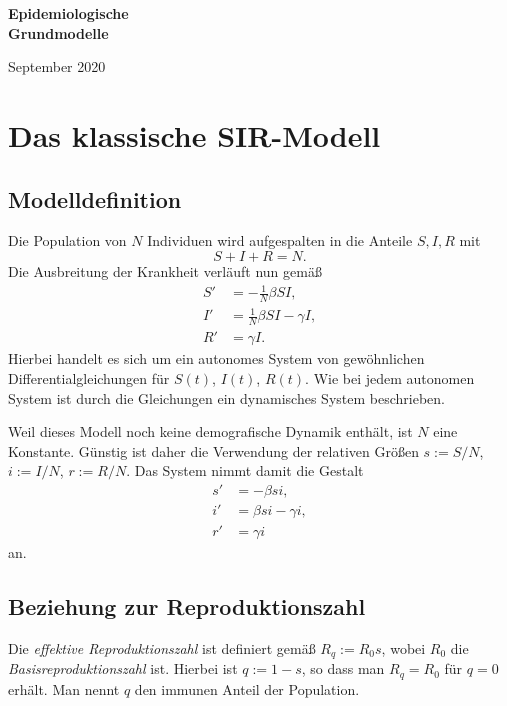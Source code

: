 \documentclass[a4paper,10pt,fleqn,twocolumn,twoside,dvipdfmx]{scrartcl}
\numberwithin{equation}{section}
\begin{document}

\noindent
{\huge\textbf{Epidemiologische\\
Grundmodelle}\par}

\vspace{1em}\noindent
{\large September 2020}

\tableofcontents

\section{Das klassische SIR-Modell}
\subsection{Modelldefinition}

Die Population von $N$ Individuen wird aufgespalten in die Anteile
$S,I,R$ mit%
\begin{equation}
S+I+R=N.
\end{equation}
Die Ausbreitung der Krankheit verläuft nun gemäß%
\begin{align}
S' &= -\tfrac{1}{N} \beta SI,\\
I' &= \tfrac{1}{N} \beta SI - \gamma I,\\
R' &= \gamma I.
\end{align}
Hierbei handelt es sich um ein autonomes System von gewöhnlichen
Differentialgleichungen für $S(t)$, $I(t)$, $R(t)$.
Wie bei jedem autonomen System ist durch die Gleichungen ein
dynamisches System beschrieben.

Weil dieses Modell noch keine demografische Dynamik enthält,
ist $N$ eine Konstante. Günstig ist daher die Verwendung der
relativen Größen $s:=S/N$, $i:=I/N$, $r:=R/N$. Das System nimmt
damit die Gestalt%
\begin{align}
\label{eq:sir-s} s' &= -\beta si,\\
\label{eq:sir-i} i' &= \beta si - \gamma i,\\
\label{eq:sir-r} r' &= \gamma i
\end{align}
an.

\subsection{Beziehung zur Reproduktionszahl}

Die \emph{effektive Reproduktionszahl} ist definiert gemäß
$R_q := R_0 s$, wobei $R_0$ die \emph{Basisreproduktionszahl} ist.
Hierbei ist $q:=1-s$, so dass man $R_q=R_0$ für $q=0$ erhält. Man nennt
$q$ den immunen Anteil der Population.
\end{document}
